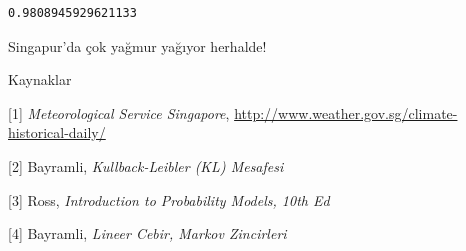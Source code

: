 \documentclass[12pt,fleqn]{article}\usepackage{../../common}
\begin{document}
\begin{verbatim}
0.9808945929621133
\end{verbatim}

Singapur'da çok yağmur yağıyor herhalde!

Kaynaklar

[1] {\em Meteorological Service Singapore},
    \url{http://www.weather.gov.sg/climate-historical-daily/}

[2] Bayramli, {\em Kullback-Leibler (KL) Mesafesi}

[3] Ross, {\em Introduction to Probability Models, 10th Ed}

[4] Bayramli, {\em Lineer Cebir, Markov Zincirleri}
\end{document}

